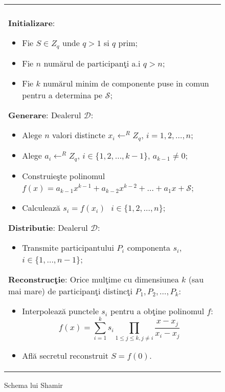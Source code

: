\documentclass{llncs}
\begin{document}
\begin{figure*}[h!]

\begin{tabular}{|p{\textwidth}|}
\hline

\\
\hspace{.1in}
\textbf{Initializare}: 
	\begin{itemize}
		\item Fie $S \in Z_q$ unde $q > 1 $ si $q$ prim;
		\item Fie $n$ num\u{a}rul de participan\c{t}i a.i $q > n$;
		\item Fie $k$ num\u{a}rul minim de componente puse in comun pentru a determina pe $\mathcal{S}$;
	\end{itemize}
\medskip

\hspace{.1in}
\textbf{Generare}: Dealerul $\mathcal{D}$:
	\begin{itemize}
		\item Alege $n$ valori distincte $x_i \leftarrow^R Z_q \text{, }i = 1,2,\dots,n$;
		\item Alege $a_{i} \leftarrow^R Z_q \text{, }i \in \{1,2,\dots,{k - 1}$\}, $a_{k-1} \neq 0$;
		\item Construie\c{s}te polinomul $f(x) = a_{k - 1}x ^ {k-1} + a_{k-2}x ^ {k - 2} + \dots + a_1x + \mathcal{S}$;
		\item Calculeaz\u{a} $s_i = f(x_i) \text{ } i \in \{1,2,\dots,n\}$;
	\end{itemize}
\medskip

\hspace{.1in}
\textbf{Distributie}: Dealerul $\mathcal{D}$:
	\begin{itemize}
		\item Transmite participantului $P_i$ componenta $s_i$, $i \in \{1,\dots,n-1\}$;
	\end{itemize}

\hspace{.1in}
\textbf{Reconstruc\c{t}ie}: Orice mul\c{t}ime cu dimensiunea $k$ (sau mai mare) de participan\c{t}i distinc\c{t}i $P_1, P_2, \dots, P_k$:
	\begin{itemize}
		\setlength{\itemsep}{5pt}
		\item Interpoleaz\u{a} punctele $s_i$ pentru a ob\c{t}ine polinomul $f$:
		\begin{equation} f(x)=\sum_{i=1}^{k} {s_i}\prod_{1 \leq j \leq k, j \neq i} \frac{x-x_j}{x_i-x_j} \end{equation}
		\item Afl\u{a} secretul reconstruit $S = f(0)$.
	\end{itemize}

\\
\hline
\end{tabular}

\caption{Schema lui Shamir \cite{S:1979}}
\label{fig:shamir_scheme}
\end{figure*}
\end{document}
